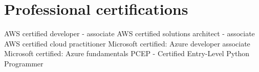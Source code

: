 \section{Professional certifications}
{%
}
{%
	AWS certified developer - associate}
{}
{%
}
{%
	AWS certified solutions architect - associate}
{}
{%
}
{%
	AWS certified cloud practitioner}
{}
{%
}
{%
	Microsoft certified: Azure developer associate}
{}
{%
}
{%
	Microsoft certified: Azure fundamentals}
{}
{%
}
{%
	PCEP - Certified Entry-Level Python Programmer}
{}
